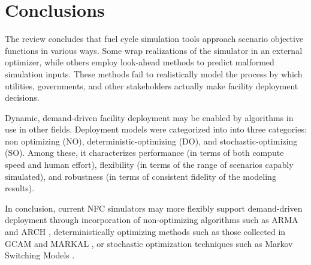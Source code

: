 
\section{Conclusions}

        The review concludes that fuel cycle simulation tools approach scenario objective functions in 
        various ways.  Some wrap realizations of the simulator in an external 
        optimizer, while others employ look-ahead methods to predict malformed 
        simulation inputs.  These methods fail to realistically model the 
        process by which utilities, governments, and other stakeholders 
        actually make facility deployment decisions.  

        Dynamic, demand-driven facility deployment may be enabled by algorithms 
        in use in other fields.  Deployment models were categorized into into 
        three categories: non optimizing (NO), deterministic-optimizing (DO), 
        and stochastic-optimizing (SO). Among these, it characterizes 
        performance (in terms of both compute speed and human effort), 
        flexibility (in terms of the range of scenarios capably simulated), and 
        robustness (in terms of consistent fidelity of the modeling results).  
        
        In conclusion, current NFC simulators may more flexibly support 
        demand-driven deployment through incorporation of non-optimizing 
        algorithms such as \gls{ARMA} \cite{woodard_stationarity_2011} and 
        \gls{ARCH} \cite{li_kernel_2016}, deterministically optimizing methods 
        such as those collected in \gls{GCAM} \cite{edmonds_advanced_1994} and 
        \gls{MARKAL} \cite{fishbone_markal_1981}, or stochastic optimization 
        techniques such as Markov Switching Models 
        \cite{ansari_predicting_2015}.  
